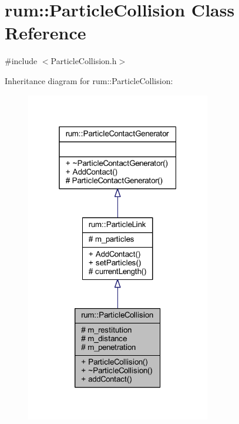 \hypertarget{classrum_1_1_particle_collision}{}\section{rum\+:\+:Particle\+Collision Class Reference}
\label{classrum_1_1_particle_collision}


{\ttfamily \#include $<$Particle\+Collision.\+h$>$}



Inheritance diagram for rum\+:\+:Particle\+Collision\+:\nopagebreak
\begin{figure}[H]
\begin{center}
\leavevmode
\includegraphics[width=229pt]{classrum_1_1_particle_collision__inherit__graph}
\end{center}
\end{figure}


